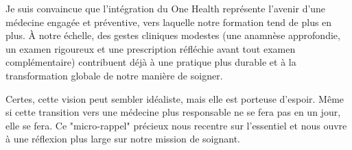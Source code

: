 Je suis convaincue que l’intégration du One Health représente l’avenir d'une médecine engagée et préventive, vers laquelle notre formation tend de plus en plus. À notre échelle, des gestes cliniques modestes (une anamnèse approfondie, un examen rigoureux et une prescription réfléchie avant tout examen complémentaire) contribuent déjà à une pratique plus durable et à la transformation globale de notre manière de soigner.


Certes, cette vision peut sembler idéaliste, mais elle est porteuse d’espoir. Même si cette transition vers une médecine plus responsable ne se fera pas en un jour, elle se fera. Ce "micro-rappel" précieux nous recentre sur l’essentiel et nous ouvre à une réflexion plus large sur notre mission de soignant.